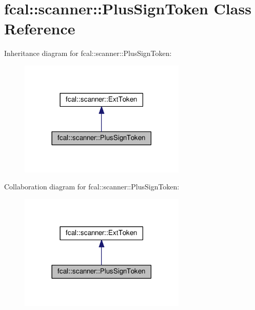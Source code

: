 \hypertarget{classfcal_1_1scanner_1_1PlusSignToken}{}\section{fcal\+:\+:scanner\+:\+:Plus\+Sign\+Token Class Reference}
\label{classfcal_1_1scanner_1_1PlusSignToken}


Inheritance diagram for fcal\+:\+:scanner\+:\+:Plus\+Sign\+Token\+:\nopagebreak
\begin{figure}[H]
\begin{center}
\leavevmode
\includegraphics[width=225pt]{classfcal_1_1scanner_1_1PlusSignToken__inherit__graph}
\end{center}
\end{figure}


Collaboration diagram for fcal\+:\+:scanner\+:\+:Plus\+Sign\+Token\+:\nopagebreak
\begin{figure}[H]
\begin{center}
\leavevmode
\includegraphics[width=225pt]{classfcal_1_1scanner_1_1PlusSignToken__coll__graph}
\end{center}
\end{figure}

